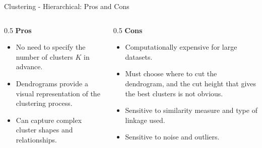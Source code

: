 \begin{frame}[allowframebreaks]{Clustering - Hierarchical: Pros and Cons}
\begin{columns}
    \begin{column}{0.5\textwidth}
        \textbf{Pros}
        \begin{itemize}
            \setlength{\itemsep}{1em}
            \item No need to specify the number of clusters $K$ in advance.
            \item Dendrograms provide a visual representation of the clustering process.
            \item Can capture complex cluster shapes and relationships.
        \end{itemize}
    \end{column}
    \begin{column}{0.5\textwidth}
        \textbf{Cons}
        \begin{itemize}
            \setlength{\itemsep}{1em}
            \item Computationally expensive for large datasets.
            \item Must choose where to cut the dendrogram, and the cut height that gives the best clusters is not obvious.
            \item Sensitive to similarity measure and type of linkage used.
            \item Sensitive to noise and outliers.
        \end{itemize}
    \end{column}
\end{columns}
\end{frame}
